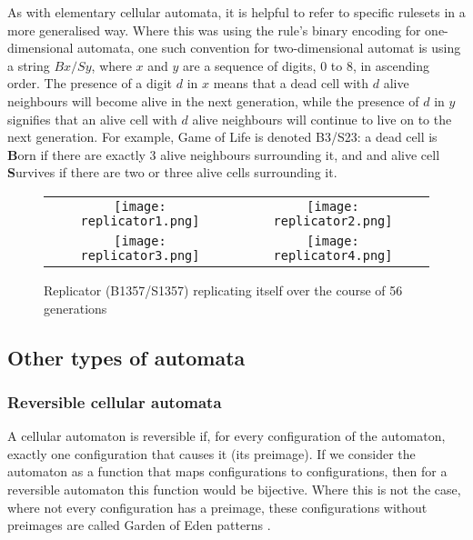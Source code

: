 \documentclass[11pt,a4paper]{article}
\begin{document}
    As with elementary cellular automata, it is helpful to refer to specific
    rulesets in a more generalised way. Where this was using the rule's binary
    encoding for one-dimensional automata, one such convention for
    two-dimensional automat is using a string $Bx/Sy$, where $x$ and $y$ are a
    sequence of digits, 0 to 8, in ascending order. The presence of a digit $d$
    in $x$ means that a dead cell with $d$ alive neighbours will become alive in
    the next generation, while the presence of $d$ in $y$ signifies that an
    alive cell with $d$ alive neighbours will continue to live on to the next
    generation. For example, Game of Life is denoted B3/S23: a dead cell is
    \textbf{B}orn if there are exactly 3 alive neighbours surrounding it, and
    and alive cell \textbf{S}urvives if there are two or three alive cells
    surrounding it.

    \begin{figure}[h]
        \begin{centering}
            \begin{tabular}{cc}
                \texttt{[image: replicator1.png]} &
                \texttt{[image: replicator2.png]} \\
                \texttt{[image: replicator3.png]} &
                \texttt{[image: replicator4.png]} \\
            \end{tabular}
            \caption{Replicator (B1357/S1357) replicating itself over the course of
            56 generations}
        \end{centering}
    \end{figure}

    \subsection{Other types of automata}
    \subsubsection{Reversible cellular automata}
    A cellular automaton is reversible if, for every configuration of the
    automaton, exactly one configuration that causes it (its preimage). If we
    consider the automaton as a function that maps configurations to
    configurations, then for a reversible automaton this function would be
    bijective. Where this is not the case, where not every configuration has a
    preimage, these configurations without preimages are called Garden of Eden
    patterns \cite{GardenOfEden}.
\end{document}
